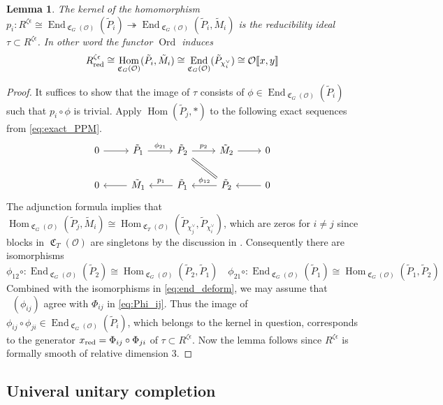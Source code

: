 \documentclass[leqno]{amsart}
\newtheorem{lem}[thm]{Lemma}
\theoremstyle{definition}
\theoremstyle{remark}
\newcommand{\oo}{\mathcal{O}}
\DeclareMathOperator{\End}{End}
\DeclareMathOperator{\Hom}{Hom}
\DeclareMathOperator{\fC}{\mathfrak{C}} %
\DeclareMathOperator{\V}{\check{\mathbf{V}}} %
\DeclareMathOperator{\Ord}{Ord} %
\newcommand{\red}{\textnormal{red}}
\newcommand{\xx}{x_\textnormal{red}}
\begin{document}
\begin{lem}\label{lem:ker_red}
	The kernel of the homomorphism
    $p_i\colon R^{\zeta\epsilon}\cong
    \End_{\fC_G(\oo)}(\tilde{P}_i)\twoheadrightarrow
	\End_{\fC_G(\oo)}(\tilde{P}_i, \tilde{M}_i)$
	is the reducibility ideal $\tau\subset R^{\zeta\epsilon}$.
    In other word the functor $\Ord$ induces
	\begin{equation}
	R^{\zeta\epsilon}_\red\cong 
	\Hom_{\fC_G(\oo)}(\tilde{P}_i, \tilde{M}_i)\cong
	\End_{\fC_G(\oo)}(\tilde{P}_{\chi_i^\vee})\cong
	\oo\llbracket x,y\rrbracket
	\end{equation}
\end{lem}
\begin{proof}
It suffices to show that 
the image of $\tau$ consists of 
$\phi\in \End_{\fC_G(\oo)}(\tilde{P}_i)$
such that $p_i\circ \phi$ is trivial.
Apply $\Hom(\tilde{P}_j,*)$
to the following exact sequences
from \eqref{eq:exact_PPM}.
\[
\begin{tikzcd}
	0 \arrow[r]&
	\tilde{P}_1  \arrow[r,"\phi_{21}"]  &
	\tilde{P}_2 \arrow[r,"p_2"] \arrow[dr,equal] &
	\tilde{M}_2  \arrow[r] & 0 \\
	0 & 
	\tilde{M}_1 \arrow[l]&
	\tilde{P}_1 \arrow[l,"p_1",swap]  &
	\tilde{P}_2  \arrow[l,"\phi_{12}",swap]  & 
	0  \arrow[l] 
\end{tikzcd}
\]
The adjunction formula implies that
$\Hom_{\fC_G(\oo)}(\tilde{P}_j,\tilde{M}_i)\cong
\Hom_{\fC_T(\oo)}
(\tilde{P}_{\chi_j^\vee},\tilde{P}_{\chi_i^\vee})$,
which are zeros for $i\neq j$
since blocks in $\fC_T(\oo)$ are singletons
by the discussion in \cite[\S 7.2]{pask}.
Consequently there are isomorphisms
\[
	\phi_{12}\circ\colon
	\End_{\fC_G(\oo)}(\tilde{P}_2)\cong
	\Hom_{\fC_G(\oo)}(\tilde{P}_2, \tilde{P}_1)\quad
	\phi_{21}\circ\colon
	\End_{\fC_G(\oo)}(\tilde{P}_1)\cong
	\Hom_{\fC_G(\oo)}(\tilde{P}_1, \tilde{P}_2)
\]
Combined with the isomorphisms in \eqref{eq:end_deform},
we may assume that $\V(\phi_{ij})$ agree with 
$\Phi_{ij}$ in \eqref{eq:Phi_ij}.
Thus the image of 
$\phi_{ij}\circ\phi_{ji}\in \End_{\fC_G(\oo)}(\tilde{P}_i)$,
which belongs to the kernel in question,
corresponds to the generator 
$\xx=\Phi_{ij}\circ\Phi_{ji}$ of 
$\tau\subset R^{\zeta\epsilon}$.
Now the lemma follows 
since $R^{\zeta\epsilon}$ is formally smooth of relative dimension  $3$.
\end{proof}

\subsection{Univeral unitary completion}
\end{document}
